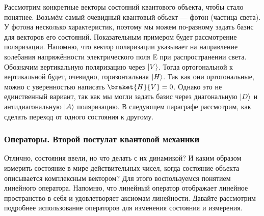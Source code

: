 Рассмотрим конкретные векторы состояний квантового объекта, чтобы стало
понятнее. Возьмём самый очевидный квантовый объект --- фотон (частица света). У
фотона несколько характеристик, поэтому мы можем по-разному задать базис для
векторов его состояний. Показательным примером будет рассмотрение поляризации.
Напомню, что вектор поляризации указывает на направление колебания
напряжённости электрического поля E при распространении света. Обозначим
вертикальную поляризацию через $\lvert V\rangle$. Тогда ортогональной к вертикальной
будет, очевидно, горизонтальная $\lvert H\rangle$. Так как они ортогональные, можно с
уверенностью написать $\braket{H}{V} = 0$. Однако это не единственный вариант,
так как мы могли задать базис через диагональную $\lvert D\rangle$ и антидиагональную
$\lvert A\rangle$ поляризацию. В следующем параграфе рассмотрим, как сделать переход от
одного состояния к другому.

\subsubsection*{Операторы. Второй постулат квантовой механики}

Отлично, состояния ввели, но что делать с их динамикой? И каким образом
измерить состояние в мире действительных чисел, когда состояние объекта
описывается комплексным вектором? Для этого воспользуемся понятием линейного
оператора. Напомню, что линейный оператор отображает линейное пространство в
себя и удовлетворяет аксиомам линейности. Давайте рассмотрим подробнее
использование операторов для изменения состояния и измерения.

